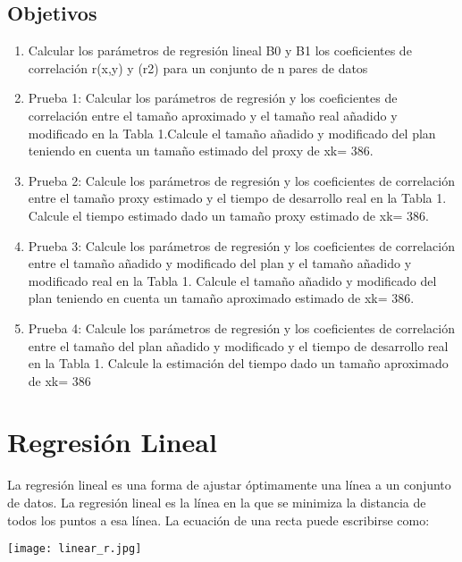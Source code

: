 \documentclass{report}
\begin{document}
\subsection{Objetivos} 
 \begin{enumerate}
 
 \item Calcular los parámetros de regresión lineal B0 y B1 los coeficientes de correlación r(x,y) y (r2) para un conjunto de n pares de datos
 
 \item Prueba 1: Calcular los parámetros de regresión y los coeficientes de correlación entre el tamaño aproximado y el tamaño real añadido y modificado en la Tabla 1.Calcule el tamaño añadido y modificado del plan teniendo en cuenta un tamaño estimado del proxy de xk= 386.

 \item Prueba 2: Calcule los parámetros de regresión y los coeficientes de correlación entre el tamaño proxy estimado y el tiempo de desarrollo real en la Tabla 1. Calcule el tiempo estimado dado un tamaño proxy estimado de xk= 386.

 \item Prueba 3: Calcule los parámetros de regresión y los coeficientes de correlación entre el tamaño añadido y modificado del plan y el tamaño añadido y modificado real en la Tabla 1. Calcule el tamaño añadido y modificado del plan teniendo en cuenta un tamaño aproximado estimado de xk= 386.

 \item Prueba 4: Calcule los parámetros de regresión y los coeficientes de correlación entre el tamaño del plan añadido y modificado y el tiempo de desarrollo real en la Tabla 1. Calcule la estimación del tiempo dado un tamaño aproximado de xk= 386 
 
\end{enumerate}



 \newpage
\section{Regresi\'on Lineal}

 La regresión lineal es una forma de ajustar óptimamente una línea a un conjunto de datos. La regresión lineal es la línea en la que se minimiza la distancia de todos los puntos a esa línea. La ecuación de una recta puede escribirse como:

 \texttt{[image: linear\_r.jpg]}
\end{document}
